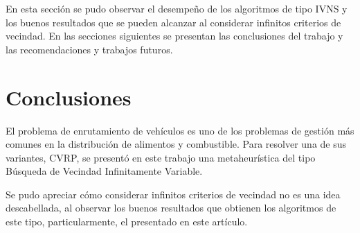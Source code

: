 \documentclass[a4paper,10pt,twocolumn]{article}
\begin{document}
	

	En esta sección se pudo observar el desempeño de los algoritmos de tipo IVNS y
	los buenos resultados que se pueden alcanzar al considerar infinitos criterios
	de vecindad. En las secciones siguientes se presentan las conclusiones del trabajo
	y las recomendaciones y trabajos futuros.
	

\section{Conclusiones}\label{sec:conc}

  El problema de enrutamiento de vehículos es uno de los problemas de gestión más
  comunes en la distribución de alimentos y combustible. Para resolver una de sus
  variantes, CVRP, se presentó en este trabajo una metaheurística del tipo Búsqueda 
  de Vecindad Infinitamente Variable.
  
  Se pudo apreciar cómo considerar infinitos criterios de vecindad no es una idea
  descabellada, al observar los buenos resultados que obtienen los algoritmos de este
  tipo, particularmente, el presentado en este artículo.
\end{document}

